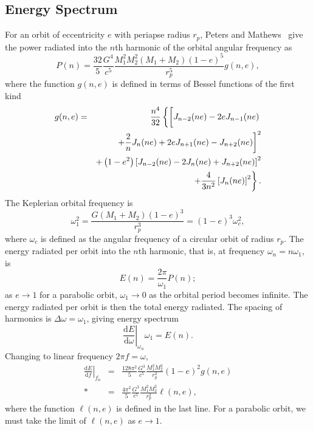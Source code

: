 \documentclass[aps,prd,amsfonts,amssymb,amsmath,nofootinbib,floatfix,reprint,showpacs,groupedaddress]{revtex4-1}
\newcommand{\dd}{\ensuremath{\mathrm{d}}}
\newcommand{\diff}[2]{\ensuremath{\frac{\dd {#1}}{\dd {#2}}}}
\begin{document}
\subsection{Energy Spectrum}

For an orbit of eccentricity $e$ with periapse radius $r_{p}$, Peters and Mathews~\cite{Peters1963} give the power radiated into the $n$th harmonic of the orbital angular frequency as
\begin{equation}
P(n) = \frac{32}{5}\frac{G^4}{c^5}\frac{M_1^2M_2^2(M_1 + M_2)(1-e)^5}{r_{p}^5}g(n,e),
\label{eq:PM_P}
\end{equation}
where the function $g(n,e)$ is defined in terms of Bessel functions of the first kind
\begin{eqnarray}
g(n,e) & = & \frac{n^4}{32}\left\{\left[J_{n-2}(ne) - 2eJ_{n-1}(ne) \vphantom{\frac{2}{n}J_n(ne)} \right. \right. \nonumber \\*
 & & \left. + \frac{2}{n}J_n(ne) + 2eJ_{n+1}(ne) - J_{n+2}(ne)\right]^2 \nonumber \\*
 & & + \left(1 - e^2\right)\left[J_{n-2}(ne) - 2J_n(ne) + J_{n+2}(ne)\right]^2 \nonumber \\*
 & & \left. + \frac{4}{3n^2}\left[J_n(ne)\right]^2\right\}.
\end{eqnarray}
The Keplerian orbital frequency is
\begin{equation}
\omega_1^2 = \frac{G(M_1 + M_2)(1 - e)^3}{r_{p}^3} = (1 - e)^3\omega_{c}^2,
\label{eq:Kepler_freq}
\end{equation}
where $\omega_{c}$ is defined as the angular frequency of a circular orbit of radius $r_{p}$. The energy radiated per orbit into the $n$th harmonic, that is, at frequency $\omega_n = n\omega_1$, is
\begin{equation}
E(n) = \frac{2\pi}{\omega_1}P(n);
\label{eq:E(n)}
\end{equation}
as $e \rightarrow 1$ for a parabolic orbit, $\omega_1 \rightarrow 0$ as the orbital period becomes infinite. The energy radiated per orbit is then the total energy radiated. The spacing of harmonics is $\Delta\omega = \omega_1$, giving energy spectrum
\begin{equation}
\left.\diff{E}{\omega}\right|_{\omega_n}\omega_1 = E(n).
\end{equation}
Changing to linear frequency $2\pi f = \omega$,
\begin{eqnarray}
\left.\diff{E}{f}\right|_{f_n} & = & \frac{128\pi^2}{5}\frac{G^3}{c^5}\frac{M_1^2M_2^2}{r_{p}^2}(1-e)^2g(n,e) \\*
 & = & \frac{4\pi^2}{5}\frac{G^3}{c^5}\frac{M_1^2M_2^2}{r_{p}^2}\ell(n,e),
\label{eq:PM_spectrum}
\end{eqnarray}
where the function $\ell(n,e)$ is defined in the last line. For a parabolic orbit, we must take the limit of $\ell(n,e)$ as $e \rightarrow 1$.
\end{document}
